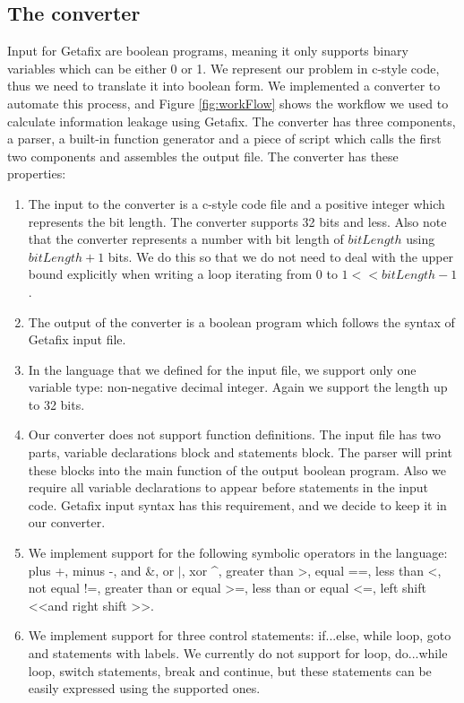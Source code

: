 \subsection{The converter}
Input for Getafix are boolean programs, meaning it only supports binary variables which can be either 0 or 1. We represent our problem in c-style code, thus we need to translate it into boolean form. We implemented a converter to automate this process, and Figure \ref{fig:workFlow} shows the workflow we used to calculate information leakage using Getafix. The converter has three components, a parser, a built-in function generator and a piece of script which calls the first two components and assembles the output file. The converter has these properties:

\begin{enumerate}
\item The input to the converter is a c-style code file and a positive integer which represents the bit length. The converter supports 32 bits and less. Also note that the converter represents a number with bit length of $bitLength$ using $bitLength + 1$ bits. We do this so that we do not need to deal with the upper bound explicitly when writing a loop iterating from $0$ to $1<<bitLength - 1$.
\item The output of the converter is a boolean program which follows the syntax of Getafix input file.
\item In the language that we defined for the input file, we support only one variable type: non-negative decimal integer. Again we support the length up to 32 bits.
\item Our converter does not support function definitions. The input file has two parts, variable declarations block and statements block. The parser will print these blocks into the main function of the output boolean program. Also we require all variable declarations to appear before statements in the input code. Getafix input syntax has this requirement, and we decide to keep it in our converter.
\item We implement support for the following symbolic operators in the language: plus +, minus -, and \&, or $|$, xor \textasciicircum , greater than \textgreater, equal ==, less than \textless, not equal !=, greater than or equal \textgreater=, less than or equal \textless=, left shift \textless\textless and right shift \textgreater\textgreater.
\item We implement support for three control statements: if...else, while loop, goto and statements with labels. We currently do not support for loop, do...while loop, switch statements, break and continue, but these statements can be easily expressed using the supported ones.
\end{enumerate}

